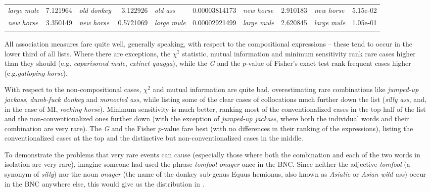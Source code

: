 \begin{sidewaystable}
{\begin{tabular}[t]{lS[table-format=5.2]lrlrlrlS[table-format=1.2e-3]}
\textit{large mule} & 7.121964 & \textit{old donkey} & \num{3.122926} & \textit{old ass} & \num[round-mode=places,round-precision=6]{0.00003814173} & \textit{new horse} & \num{2.910183} & \textit{new horse} & 5.15e-02 \\
\textit{new horse} & 3.350149 & \textit{new horse} & \num{0.5721069} & \textit{large mule} & \num[round-mode=places,round-precision=6]{0.00002921499} & \textit{large mule} & \num{2.620845} & \textit{large mule} & 1.05e-01 \\
\lspbottomrule
\end{tabular}}
\end{sidewaystable}

All association  measures  fare quite well, generally speaking, with respect to the compositional  expressions -- these tend to occur in the lower third of all lists. Where there are exceptions, the $\chi^2$ statistic,  mutual information  and minimum sensitivity  rank rare cases higher than they should (e.g. \textit{caparisoned mule}, \textit{extinct quagga}), while the \emph{G}  and the $p$-value of Fisher's exact test  rank frequent cases higher (e.g.\textit{galloping horse}).

With respect to the non\hyp{}compositional  cases, $\chi^2$  and mutual information  are quite bad, overestimating rare combinations like \textit{jumped\hyp{}up jackass}, \textit{dumb\hyp{}fuck donkey} and \textit{monocled ass}, while listing some of the clear cases of collocations  much further down the list (\textit{silly ass}, and, in the case of MI, \textit{rocking horse}). Minimum sensitivity  is much better, ranking most of the conventionalized  cases in the top half of the list and the non\hyp{}conventionalized ones further down (with the exception of \textit{jumped\hyp{}up jackass}, where both the individual words and their combination are very rare). The \emph{G}  and the Fisher  $p$-value fare best (with no differences in their ranking of the expressions), listing the conventionalized  cases at the top and the distinctive but non\hyp{}conventionalized cases in the middle.

To demonstrate the problems that very rare events can cause (especially those where both the combination and each of the two words in isolation are very rare), imagine someone had used the phrase \textit{tomfool onager} once in the BNC.  Since neither the adjective  \textit{tomfool} (a synonym  of \textit{silly}) nor the noun  \textit{onager} (the name of the donkey sub\hyp{}genus Equus hemionus, also known as \textit{Asiatic} or \textit{Asian wild ass}) occur in the BNC  anywhere else, this would give us the distribution  in .


